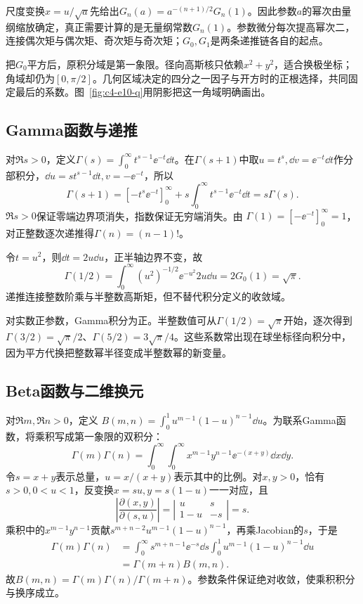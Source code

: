 尺度变换$x=u/\sqrt a$先给出$G_n(a)=a^{-(n+1)/2}G_n(1)$。因此参数$a$的幂次由量纲缩放确定，真正需要计算的是无量纲常数$G_n(1)$。参数微分每次提高幂次二，连接偶次矩与偶次矩、奇次矩与奇次矩；$G_0,G_1$是两条递推链各自的起点。

把$G_0$平方后，原积分域是第一象限。径向高斯核只依赖$x^2+y^2$，适合换极坐标；角域却仍为$[0,\pi/2]$。几何区域决定的四分之一因子与开方时的正根选择，共同固定最后的系数。图~\ref{fig:c4-e10-q}用阴影把这一角域明确画出。

\subsection{Gamma函数与递推}
对$\Re s>0$，定义$\Gamma(s)=\int_0^\infty t^{s-1}\ee^{-t}\dd t$。在$\Gamma(s+1)$中取$u=t^s,\dd v=\ee^{-t}\dd t$作分部积分，$\dd u=st^{s-1}\dd t,v=-\ee^{-t}$，所以
\[\Gamma(s+1)=[-t^s\ee^{-t}]_0^\infty
+s\int_0^\infty t^{s-1}\ee^{-t}\dd t=s\Gamma(s).\]
$\Re s>0$保证零端边界项消失，指数保证无穷端消失。由
$\Gamma(1)=[-\ee^{-t}]_0^\infty=1$，对正整数逐次递推得$\Gamma(n)=(n-1)!$。

令$t=u^2$，则$\dd t=2u\dd u$，正半轴边界不变，故
\[\Gamma(1/2)=\int_0^\infty(u^2)^{-1/2}\ee^{-u^2}2u\dd u
=2G_0(1)=\sqrt\pi.\]
递推连接整数阶乘与半整数高斯矩，但不替代积分定义的收敛域。

对实数正参数，Gamma积分为正。半整数值可从$\Gamma(1/2)=\sqrt\pi$开始，逐次得到$\Gamma(3/2)=\sqrt\pi/2$、$\Gamma(5/2)=3\sqrt\pi/4$。这些系数常出现在球坐标径向积分中，因为平方代换把整数幂半径变成半整数幂的新变量。

\subsection{Beta函数与二维换元}
对$\Re m,\Re n>0$，定义
$B(m,n)=\int_0^1u^{m-1}(1-u)^{n-1}\dd u$。为联系Gamma函数，将乘积写成第一象限的双积分：
\[\Gamma(m)\Gamma(n)=\int_0^\infty\!\int_0^\infty
x^{m-1}y^{n-1}\ee^{-(x+y)}\dd x\dd y.\]
令$s=x+y$表示总量，$u=x/(x+y)$表示其中的比例。对$x,y>0$，恰有$s>0,0<u<1$，反变换$x=su,y=s(1-u)$一一对应，且
\[\left|\frac{\partial(x,y)}{\partial(s,u)}\right|
=\left|\begin{matrix}u&s\\1-u&-s\end{matrix}\right|=s.\]
乘积中的$x^{m-1}y^{n-1}$贡献$s^{m+n-2}u^{m-1}(1-u)^{n-1}$，再乘Jacobian的$s$，于是
\[\begin{aligned}
\Gamma(m)\Gamma(n)
&=\int_0^\infty s^{m+n-1}\ee^{-s}\dd s
\int_0^1u^{m-1}(1-u)^{n-1}\dd u\\
&=\Gamma(m+n)B(m,n).
\end{aligned}\]
故$\boxed{B(m,n)=\Gamma(m)\Gamma(n)/\Gamma(m+n)}$。参数条件保证绝对收敛，使乘积积分与换序成立。


